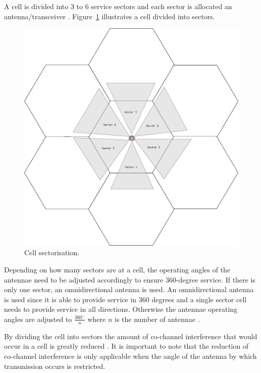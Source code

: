 A cell is divided into 3 to 6 service sectors and each sector is allocated an antenna/transceiver \cite{GSMSysEngin}. Figure~\ref{fig:cellsector} illustrates a cell divided into sectors. 

\begin{figure}[H]
	\begin{centering}
	\includegraphics[scale=0.5]{tikz-pics/cellsector.pdf}
	\caption[Cell Sectorisation]{Cell sectorisation\cite{GSMSysEngin}.}
	\label{fig:cellsector}
	\end{centering}
\end{figure}

Depending on how many sectors are at a cell, the operating angles of the antennae need to be adjusted accordingly to ensure 360-degree service. If there is only one sector, an omnidirectional antenna is used. An omnidirectional antenna is used since it is able to provide service in 360 degrees and a single sector cell needs to provide service in all directions. Otherwise the antennae operating angles are adjusted to $\frac{360\,^{\circ}}{n}$ where ${n}$ is the number of antennae \cite{Eisenblatter}.

By dividing the cell into sectors the amount of co-channel interference that would occur in a cell is greatly reduced \cite{GSMArchitectureProtocolsServices}. It is important to note that the reduction of co-channel interference is only applicable when the angle of the antenna by which transmission occurs is restricted\cite{GSMArchitectureProtocolsServices}.

